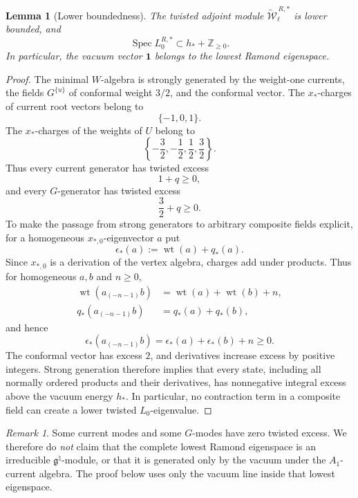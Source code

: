 \documentclass[11pt]{amsart}
\newtheorem{lemma}[theorem]{Lemma}
\theoremstyle{remark}
\newtheorem{remark}[theorem]{Remark}
\numberwithin{equation}{section}
\begin{document}
\begin{lemma}[Lower boundedness]
The twisted adjoint module
\(\widetilde{\mathcal W}_\ell^{\,R,*}\) is lower bounded, and
\[
   \operatorname{Spec}L_0^{R,*}
   \subset
   h_*+\mathbb Z_{\ge0}.
\]
In particular, the vacuum vector \(\mathbf1\) belongs to the lowest Ramond
eigenspace.
\end{lemma}

\begin{proof}
The minimal \(W\)-algebra is strongly generated by the weight-one currents,
the fields \(G^{\{u\}}\) of conformal weight \(3/2\), and the conformal
vector.  The \(x_*\)-charges of current root vectors belong to
\[
   \{-1,0,1\}.
\]
The \(x_*\)-charges of the weights of \(U\) belong to
\[
   \left\{
      -\frac32,-\frac12,\frac12,\frac32
   \right\}.
\]
Thus every current generator has twisted excess
\[
   1+q\ge0,
\]
and every \(G\)-generator has twisted excess
\[
   \frac32+q\ge0.
\]
To make the passage from strong generators to arbitrary composite fields
explicit, for a homogeneous \(x_{*,0}\)-eigenvector \(a\) put
\[
   \epsilon_*(a):=\operatorname{wt}(a)+q_*(a).
\]
Since \(x_{*,0}\) is a derivation of the vertex algebra, charges add under
products.  Thus for homogeneous \(a,b\) and \(n\ge0\),
\begin{equation}
\label{eq:twisted-excess-additivity}
\begin{aligned}
   \operatorname{wt}\!\left(a_{(-n-1)}b\right)
      &=\operatorname{wt}(a)+\operatorname{wt}(b)+n,\\
   q_*\!\left(a_{(-n-1)}b\right)
      &=q_*(a)+q_*(b),
\end{aligned}
\end{equation}
and hence
\[
   \epsilon_*\!\left(a_{(-n-1)}b\right)
   =\epsilon_*(a)+\epsilon_*(b)+n\ge0.
\]
The conformal vector has excess \(2\), and derivatives increase excess by
positive integers.  Strong generation therefore implies that every state,
including all normally ordered products and their derivatives, has
nonnegative integral excess above the vacuum energy \(h_*\).  In particular,
no contraction term in a composite field can create a lower twisted
\(L_0\)-eigenvalue.
\end{proof}

\begin{remark}
Some current modes and some \(G\)-modes have zero twisted excess.  We
therefore do \emph{not} claim that the complete lowest Ramond eigenspace is
an irreducible \(\mathfrak g^\natural\)-module, or that it is generated only
by the vacuum under the \(A_1\)-current algebra.  The proof below uses only
the vacuum line inside that lowest eigenspace.
\end{remark}
\end{document}
